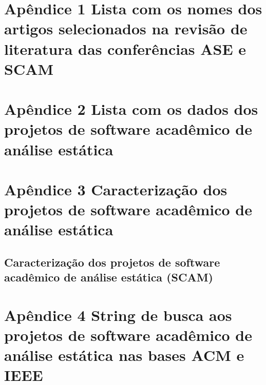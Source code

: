 \documentclass{article}
\begin{document}
\section{Apêndice 1 Lista com os nomes dos artigos selecionados na revisão de literatura das conferências ASE e SCAM}



\section{Apêndice 2 Lista com os dados dos projetos de software acadêmico de análise estática}



\section{Apêndice 3 Caracterização dos projetos de software acadêmico de análise estática}



\subsection{Caracterização dos projetos de software acadêmico de análise estática (SCAM)}



\section{Apêndice 4 String de busca aos projetos de software acadêmico de análise estática nas bases ACM e IEEE}


\end{document}
